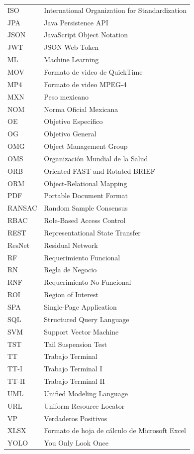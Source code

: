 \begin{longtable}{@{}p{3.2cm}p{10.8cm}@{}}
ISO      & International Organization for Standardization \\[2pt]
JPA      & Java Persistence API \\[2pt]
JSON     & JavaScript Object Notation \\[2pt]
JWT      & JSON Web Token \\[2pt]
ML       & Machine Learning \\[2pt]
MOV      & Formato de video de QuickTime \\[2pt]
MP4      & Formato de video MPEG-4 \\[2pt]
MXN      & Peso mexicano \\[2pt]
NOM      & Norma Oficial Mexicana \\[2pt]
OE       & Objetivo Específico \\[2pt]
OG       & Objetivo General \\[2pt]
OMG      & Object Management Group \\[2pt]
OMS      & Organización Mundial de la Salud \\[2pt]
ORB      & Oriented FAST and Rotated BRIEF \\[2pt]
ORM      & Object-Relational Mapping \\[2pt]
PDF      & Portable Document Format \\[2pt]
RANSAC   & Random Sample Consensus \\[2pt]
RBAC     & Role-Based Access Control \\[2pt]
REST     & Representational State Transfer \\[2pt]
ResNet   & Residual Network \\[2pt]
RF       & Requerimiento Funcional \\[2pt]
RN       & Regla de Negocio \\[2pt]
RNF      & Requerimiento No Funcional \\[2pt]
ROI      & Region of Interest \\[2pt]
SPA      & Single-Page Application \\[2pt]
SQL      & Structured Query Language \\[2pt]
SVM      & Support Vector Machine \\[2pt]
TST      & Tail Suspension Test \\[2pt]
TT       & Trabajo Terminal \\[2pt]
TT-I     & Trabajo Terminal I \\[2pt]
TT-II    & Trabajo Terminal II \\[2pt]
UML      & Unified Modeling Language \\[2pt]
URL      & Uniform Resource Locator \\[2pt]
VP       & Verdaderos Positivos \\[2pt]
XLSX     & Formato de hoja de cálculo de Microsoft Excel \\[2pt]
YOLO     & You Only Look Once \\[2pt]

\end{longtable}
